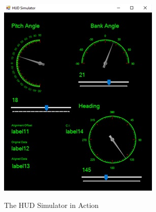 \begin{figure}
 	\caption{The HUD Simulator in Action}
    \includegraphics{img/hudsimaction}
    \label{fig:hudsimaction}
\end{figure}




